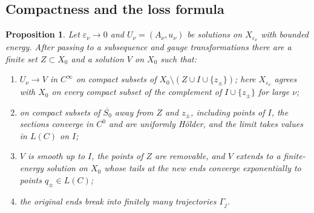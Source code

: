 \documentclass[11pt]{amsart}
\newtheorem{proposition}[theorem]{Proposition}
\theoremstyle{definition}
\theoremstyle{remark}
\theoremstyle{plain}
\numberwithin{equation}{section}
\newcommand{\eps}{\varepsilon}
\begin{document}
\subsection{Compactness and the loss formula}\label{subsec:compactness}

\begin{proposition}\label{prop:weak-limit}
Let $\eps_\nu\to0$ and $U_\nu=(A_\nu,u_\nu)$ be solutions on
$X_{\eps_\nu}$ with bounded energy. After passing to a subsequence and
gauge transformations there are a finite set $Z\subset X_0$ and a solution
$V$ on $X_0$ such that:
\begin{enumerate}[label=(\roman*)]
\item $U_\nu\to V$ in $C^\infty$ on compact subsets of $X_0\setminus(Z\cup
  I\cup\{z_\pm\})$; here $X_{\eps_\nu}$ agrees with $X_0$ on every compact
  subset of the complement of $I\cup\{z_\pm\}$ for large $\nu$;
\item on compact subsets of $\overline{S_0}$ away from $Z$ and $z_\pm$,
  including points of $I$, the sections converge in $C^0$ and are
  uniformly Hölder, and the limit takes values in $L(C)$ on $I$;
\item $V$ is smooth up to $I$, the points of $Z$ are removable, and $V$
  extends to a finite-energy solution on $X_0$ whose tails at the new ends
  converge exponentially to points $q_\pm\in L(C)$;
\item the original ends break into finitely many trajectories $\Gamma_j$.
\end{enumerate}
\end{proposition}
\end{document}
